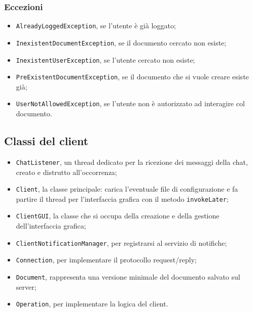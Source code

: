 \subsubsection{Eccezioni}
\begin{itemize}
	\item \texttt{AlreadyLoggedException}, se l'utente è già loggato;
	\item \texttt{InexistentDocumentException}, se il documento cercato non esiste;
	\item \texttt{InexistentUserException}, se l'utente cercato non esiste;
	\item \texttt{PreExistentDocumentException}, se il documento che si vuole creare esiste già;
	\item \texttt{UserNotAllowedException}, se l'utente non è autorizzato ad interagire col documento.
\end{itemize}

\subsection{Classi del client}
\begin{itemize}
	\item \texttt{ChatListener}, un thread dedicato per la ricezione dei messaggi della chat, creato e distrutto all'occorrenza;
	\item \texttt{Client}, la classe principale: carica l'eventuale file di configurazione e fa partire il thread per l'interfaccia grafica con il metodo \texttt{invokeLater};
	\item \texttt{ClientGUI}, la classe che si occupa della creazione e della gestione dell'interfaccia grafica;
	\item \texttt{ClientNotificationManager}, per registrarsi al servizio di notifiche;
	\item \texttt{Connection}, per implementare il protocollo request/reply;
	\item \texttt{Document}, rappresenta una versione minimale del documento salvato sul server;
	\item \texttt{Operation}, per implementare la logica del client.
\end{itemize}
